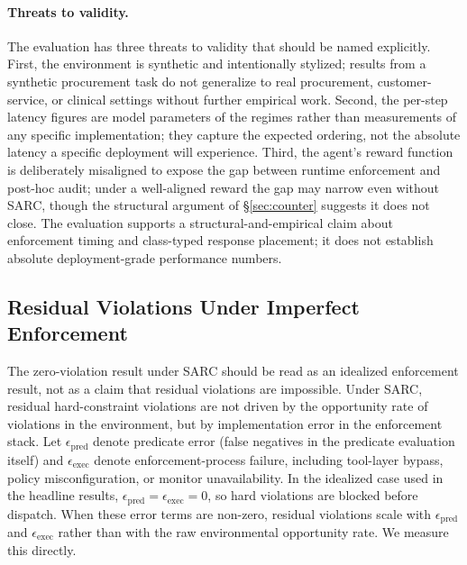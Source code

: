 \documentclass[11pt,a4paper]{article}
\theoremstyle{remark}
\begin{document}
\paragraph{Threats to validity.} The evaluation has three threats to validity that should be named explicitly. First, the environment is synthetic and intentionally stylized; results from a synthetic procurement task do not generalize to real procurement, customer-service, or clinical settings without further empirical work. Second, the per-step latency figures are model parameters of the regimes rather than measurements of any specific implementation; they capture the expected ordering, not the absolute latency a specific deployment will experience. Third, the agent's reward function is deliberately misaligned to expose the gap between runtime enforcement and post-hoc audit; under a well-aligned reward the gap may narrow even without SARC, though the structural argument of \S\ref{sec:counter} suggests it does not close. The evaluation supports a structural-and-empirical claim about enforcement timing and class-typed response placement; it does not establish absolute deployment-grade performance numbers.

\subsection{Residual Violations Under Imperfect Enforcement}\label{sec:residual}

The zero-violation result under SARC should be read as an idealized enforcement result, not as a claim that residual violations are impossible. Under SARC, residual hard-constraint violations are not driven by the opportunity rate of violations in the environment, but by implementation error in the enforcement stack. Let $\epsilon_{\text{pred}}$ denote predicate error (false negatives in the predicate evaluation itself) and $\epsilon_{\text{exec}}$ denote enforcement-process failure, including tool-layer bypass, policy misconfiguration, or monitor unavailability. In the idealized case used in the headline results, $\epsilon_{\text{pred}} = \epsilon_{\text{exec}} = 0$, so hard violations are blocked before dispatch. When these error terms are non-zero, residual violations scale with $\epsilon_{\text{pred}}$ and $\epsilon_{\text{exec}}$ rather than with the raw environmental opportunity rate. We measure this directly.
\end{document}
